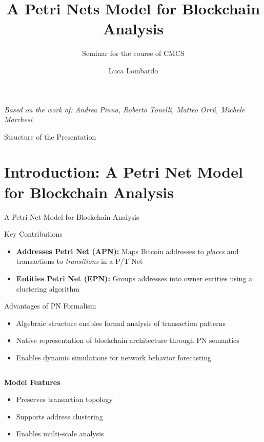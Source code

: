 \documentclass{beamer}
\title{A Petri Nets Model for Blockchain Analysis}
\subtitle{Seminar for the course of CMCS}
\author{Luca Lombardo}
\date{}
\begin{document}
\begin{frame}[plain]
    \titlepage
    \begin{center}
        \footnotesize{\textit{Based on the work of: Andrea Pinna, Roberto Tonelli, Matteo Orr\'{u}, Michele Marchesi}}
    \end{center}
\end{frame}

\begin{frame}{Structure of the Presentation}
    \tableofcontents
\end{frame}

\section{Introduction: A Petri Net Model for Blockchain Analysis}
\label{sec:Intro}
\begin{frame}{A Petri Net Model for Blockchain Analysis}
    \footnotesize

    \begin{block}{Key Contributions}
        \begin{itemize}
            \item \textbf{Addresses Petri Net (APN):} Maps Bitcoin addresses to \textit{places} and transactions to \textit{transitions} in a P/T Net
            \item \textbf{Entities Petri Net (EPN):} Groups addresses into owner entities using a clustering algorithm
        \end{itemize}
    \end{block}

    \vspace{-0.2cm}
    \begin{block}{Advantages of PN Formalism}
        \begin{itemize}
            \item Algebraic structure enables formal analysis of transaction patterns
            \item Native representation of blockchain architecture through PN semantics
            \item Enables dynamic simulations for network behavior forecasting
        \end{itemize}
    \end{block}

    \vspace{-0.2cm}
    \begin{columns}[T]
        \begin{column}{0.5\textwidth}
            \textbf{Model Features}
            \begin{itemize}
                \item Preserves transaction topology
                \item Supports address clustering
                \item Enables multi-scale analysis
            \end{itemize}
        \end{column}


\end{columns}
\end{frame}
\end{document}
